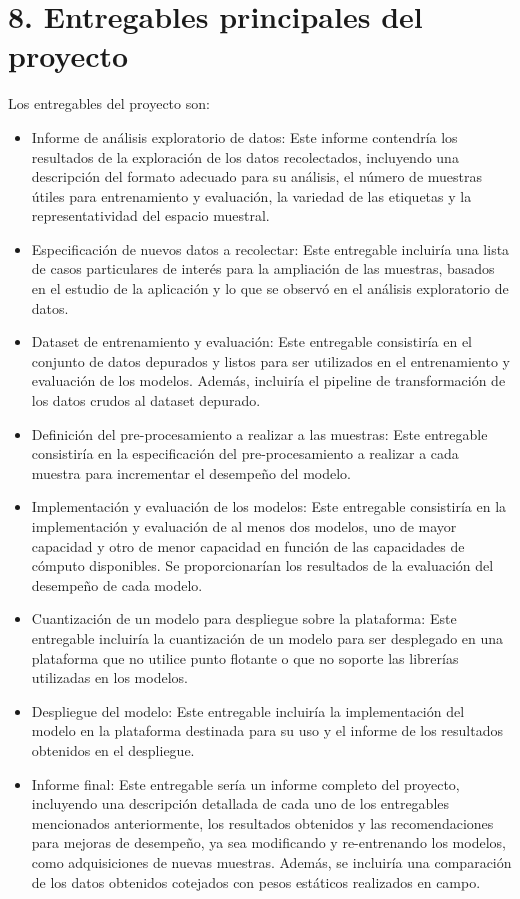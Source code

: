 \documentclass[
11pt, %
codirector, %
]{charter}
\begin{document}
\section{8. Entregables principales del proyecto}
\label{sec:entregables}



Los entregables del proyecto son:

\begin{itemize}
	\item Informe de análisis exploratorio de datos: Este informe contendría los resultados de la exploración de los datos recolectados, incluyendo una descripción del formato adecuado para su análisis, el número de muestras útiles para entrenamiento y evaluación, la variedad de las etiquetas y la representatividad del espacio muestral.
	\item Especificación de nuevos datos a recolectar: Este entregable incluiría una lista de casos particulares de interés para la ampliación de las muestras, basados en el estudio de la aplicación y lo que se observó en el análisis exploratorio de datos.
	\item Dataset de entrenamiento y evaluación: Este entregable consistiría en el conjunto de datos depurados y listos para ser utilizados en el entrenamiento y evaluación de los modelos. Además, incluiría el pipeline de transformación de los datos crudos al dataset depurado.
	\item Definición del pre-procesamiento a realizar a las muestras: Este entregable consistiría en la especificación del pre-procesamiento a realizar a cada muestra para incrementar el desempeño del modelo.
	\item Implementación y evaluación de los modelos: Este entregable consistiría en la implementación y evaluación de al menos dos modelos, uno de mayor capacidad y otro de menor capacidad en función de las capacidades de cómputo disponibles. Se proporcionarían los resultados de la evaluación del desempeño de cada modelo.
	\item Cuantización de un modelo para despliegue sobre la plataforma: Este entregable incluiría la cuantización de un modelo para ser desplegado en una plataforma que no utilice punto flotante o que no soporte las librerías utilizadas en los modelos.
	\item Despliegue del modelo: Este entregable incluiría la implementación del modelo en la plataforma destinada para su uso y el informe de los resultados obtenidos en el despliegue.
	\item Informe final: Este entregable sería un informe completo del proyecto, incluyendo una descripción detallada de cada uno de los entregables mencionados anteriormente, los resultados obtenidos y las recomendaciones para mejoras de desempeño, ya sea modificando y re-entrenando los modelos, como adquisiciones de nuevas muestras. Además, se incluiría una comparación de los datos obtenidos cotejados con pesos estáticos realizados en campo.
\end{itemize}
\end{document}

